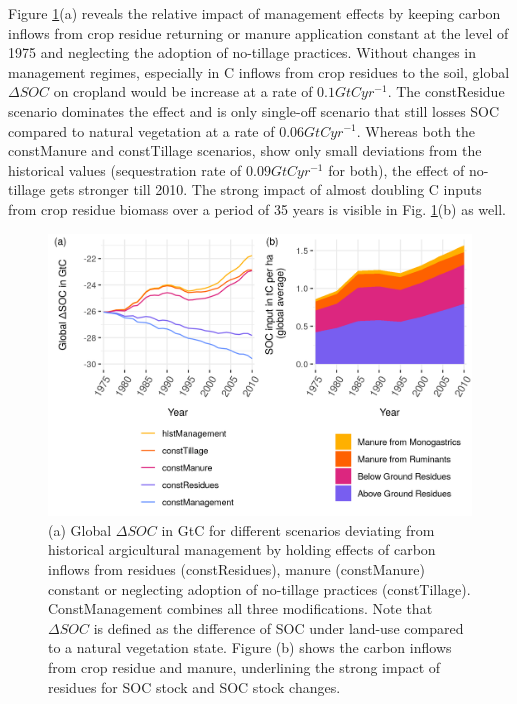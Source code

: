 \documentclass[gc, manuscript]{copernicus}
\begin{document}
Figure \ref{fig:SOCscen}(a) reveals the relative impact of management effects by keeping carbon inflows from crop residue returning or manure application constant at the level of 1975 and neglecting the adoption of no-tillage practices. Without changes in management regimes, especially in C inflows from crop residues to the soil, global \(\Delta SOC\) on cropland would be increase at a rate of \(0.1\unit{GtC yr^{-1}}\). The constResidue scenario dominates the effect and is only single-off scenario that still losses SOC compared to natural vegetation at a rate of \(0.06\unit{GtC yr^{-1}}\). Whereas both the constManure and constTillage scenarios, show only small deviations from the historical values (sequestration rate of \(0.09\unit{GtC yr^{-1}}\) for both), the effect of no-tillage gets stronger till 2010.
The strong impact of almost doubling C inputs from crop residue biomass over a period of 35 years is visible in Fig. \ref{fig:SOCscen}(b) as well.

\begin{figure}
\includegraphics[width=14cm]{../ResultNotebooks/Output/Images/scenario_horiz} \caption{(a) Global $\Delta SOC$ in GtC for different scenarios deviating from historical argicultural management by holding effects of carbon inflows from residues (constResidues), manure (constManure) constant or neglecting adoption of no-tillage practices (constTillage). ConstManagement combines all three modifications. Note that $\Delta SOC$ is defined as the difference of SOC under land-use compared to a natural vegetation state. Figure (b) shows the carbon inflows from crop residue and manure, underlining the strong impact of residues for SOC stock and SOC stock changes.}\label{fig:SOCscen}
\end{figure}
\end{document}
